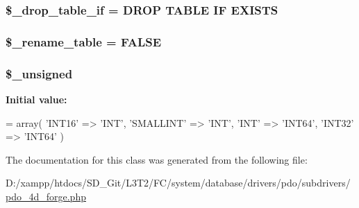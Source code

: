 \subsubsection[{\$\+\_\+drop\+\_\+table\+\_\+if}]{\setlength{\rightskip}{0pt plus 5cm}\$\+\_\+drop\+\_\+table\+\_\+if = \textquotesingle{}D\+R\+O\+P T\+A\+B\+L\+E I\+F E\+X\+I\+S\+T\+S\textquotesingle{}\hspace{0.3cm}{\ttfamily [protected]}}\label{class_c_i___d_b__pdo__4d__forge_a92a8a9145a7fc91e252e58d019373581}
\hypertarget{class_c_i___d_b__pdo__4d__forge_a1a649e7cf9de16bcf932977b18bc91de}{}
\subsubsection[{\$\+\_\+rename\+\_\+table}]{\setlength{\rightskip}{0pt plus 5cm}\$\+\_\+rename\+\_\+table = F\+A\+L\+S\+E\hspace{0.3cm}{\ttfamily [protected]}}\label{class_c_i___d_b__pdo__4d__forge_a1a649e7cf9de16bcf932977b18bc91de}
\hypertarget{class_c_i___d_b__pdo__4d__forge_aae977ae6d61fa183f0b25422b6ddc31c}{}
\subsubsection[{\$\+\_\+unsigned}]{\setlength{\rightskip}{0pt plus 5cm}\$\+\_\+unsigned\hspace{0.3cm}{\ttfamily [protected]}}\label{class_c_i___d_b__pdo__4d__forge_aae977ae6d61fa183f0b25422b6ddc31c}
{\bfseries Initial value\+:}
\begin{DoxyCode}
= array(
        \textcolor{stringliteral}{'INT16'}     => \textcolor{stringliteral}{'INT'},
        \textcolor{stringliteral}{'SMALLINT'}  => \textcolor{stringliteral}{'INT'},
        \textcolor{stringliteral}{'INT'}       => \textcolor{stringliteral}{'INT64'},
        \textcolor{stringliteral}{'INT32'}     => \textcolor{stringliteral}{'INT64'}
    )
\end{DoxyCode}


The documentation for this class was generated from the following file\+:\begin{DoxyCompactItemize}
\item 
D\+:/xampp/htdocs/\+S\+D\+\_\+\+Git/\+L3\+T2/\+F\+C/system/database/drivers/pdo/subdrivers/\hyperlink{pdo__4d__forge_8php}{pdo\+\_\+4d\+\_\+forge.\+php}\end{DoxyCompactItemize}

